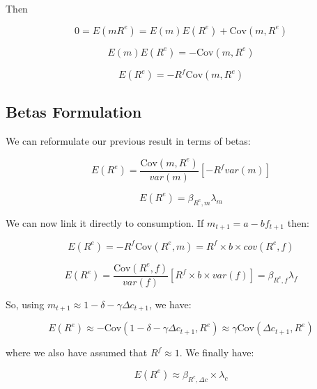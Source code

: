 Then 

\begin{equation}
    0 = E(mR^e) = E(m)E(R^e) + \text{Cov}(m, R^e)
\end{equation}

\begin{equation}
    E(m)E(R^e) = -\text{Cov}(m, R^e)
\end{equation}

\begin{equation}
    E(R^e) = - R^f \text{Cov}(m, R^e)
\end{equation}

\subsection{Betas Formulation}

We can reformulate our previous result in terms of betas:

\begin{equation}
    E(R^e) = \frac{\text{Cov}(m, R^e)}{var(m)}[-R^f var(m)]
\end{equation}

\begin{equation}
    E(R^e) = \beta_{R^e, m} \lambda_m
\end{equation}

We can now link it directly to consumption. If $m_{t+1} = a - bf_{t+1}$
then:

\begin{equation}
    E(R^e) = -R^f \text{Cov}(R^e, m) = R^f \times b \times cov(R^e, f)
\end{equation}

\begin{equation}
    E(R^e) = \frac{\text{Cov}(R^e,f)}{var(f)}[R^f \times b \times var(f)] = \beta_{R^e,f} \lambda_f
\end{equation}

So, using $m_{t+1} \approx 1 - \delta - \gamma \Delta c_{t+1}$, we have:

\begin{equation}
    E(R^e) \approx -\text{Cov}(1 - \delta - \gamma \Delta c_{t+1}, R^e) \approx \gamma \text{Cov}(\Delta c_{t+1}, R^e)
\end{equation}

where we also have assumed that $R^f \approx 1$. We finally have:

\begin{equation}
    E(R^e) \approx \beta_{R^e, \Delta c} \times \lambda_c
\end{equation}

